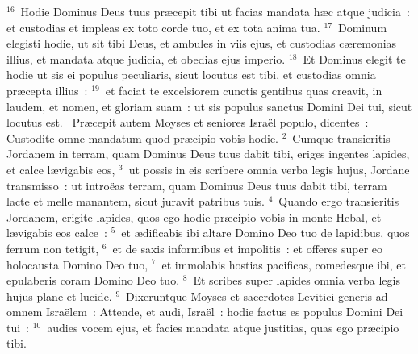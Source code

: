 ${}^{16}$~Hodie Dominus Deus tuus pr\ae cepit tibi ut facias mandata h\ae c atque judicia~: et custodias et impleas ex toto corde tuo, et ex tota anima tua.
${}^{17}$~Dominum elegisti hodie, ut sit tibi Deus, et ambules in viis ejus, et custodias c\ae remonias illius, et mandata atque judicia, et obedias ejus imperio.
${}^{18}$~Et Dominus elegit te hodie ut sis ei populus peculiaris, sicut locutus est tibi, et custodias omnia pr\ae cepta illius~:
${}^{19}$~et faciat te excelsiorem cunctis gentibus quas creavit, in laudem, et nomen, et gloriam suam~: ut sis populus sanctus Domini Dei tui, sicut locutus est.
~Pr\ae cepit autem Moyses et seniores Isra\"el populo, dicentes~: Custodite omne mandatum quod pr\ae cipio vobis hodie.
${}^{2}$~Cumque transieritis Jordanem in terram, quam Dominus Deus tuus dabit tibi, eriges ingentes lapides, et calce l\ae vigabis eos,
${}^{3}$~ut possis in eis scribere omnia verba legis hujus, Jordane transmisso~: ut intro\"eas terram, quam Dominus Deus tuus dabit tibi, terram lacte et melle manantem, sicut juravit patribus tuis.
${}^{4}$~Quando ergo transieritis Jordanem, erigite lapides, quos ego hodie pr\ae cipio vobis in monte Hebal, et l\ae vigabis eos calce~:
${}^{5}$~et \ae dificabis ibi altare Domino Deo tuo de lapidibus, quos ferrum non tetigit,
${}^{6}$~et de saxis informibus et impolitis~: et offeres super eo holocausta Domino Deo tuo,
${}^{7}$~et immolabis hostias pacificas, comedesque ibi, et epulaberis coram Domino Deo tuo.
${}^{8}$~Et scribes super lapides omnia verba legis hujus plane et lucide.
${}^{9}$~Dixeruntque Moyses et sacerdotes Levitici generis ad omnem Isra\"elem~: Attende, et audi, Isra\"el~: hodie factus es populus Domini Dei tui~:
${}^{10}$~audies vocem ejus, et facies mandata atque justitias, quas ego pr\ae cipio tibi.


